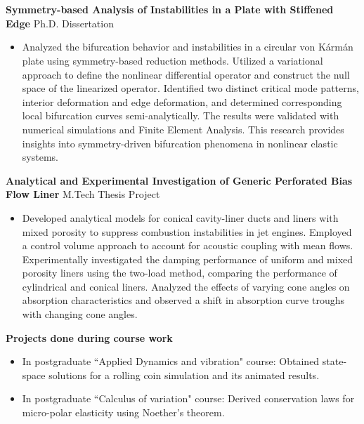 \documentclass[a4paper,10pt]{article}
\newcommand{\mysectionast}[1]{\section*{\colorbox{lightgray}{\makebox[\linewidth][s]{#1\hfill}}}}
\begin{document}
	\mysectionast{Research Topics and Projects}
	\noindent
	\textbf{Symmetry-based Analysis of Instabilities in a Plate with Stiffened Edge} \hfill Ph.D. Dissertation
	\begin{itemize}[left=0pt, label={--}]
		\item Analyzed the bifurcation behavior and instabilities in a circular von Kármán plate using symmetry-based reduction methods. Utilized a variational approach to define the nonlinear differential operator and construct the null space of the linearized operator. Identified two distinct critical mode patterns, interior deformation and edge deformation, and determined corresponding local bifurcation curves semi-analytically. The results were validated with numerical simulations and Finite Element Analysis. This research provides insights into symmetry-driven bifurcation phenomena in nonlinear elastic systems.
	\end{itemize}
	
	
	\noindent
	\textbf{Analytical and Experimental Investigation of Generic Perforated Bias Flow Liner} \hfill M.Tech Thesis Project
	\begin{itemize}[left=0pt, label={--}]
		\item Developed analytical models for conical cavity-liner ducts and liners with mixed porosity to suppress combustion instabilities in jet engines. Employed a control volume approach to account for acoustic coupling with mean flows. Experimentally investigated the damping performance of uniform and mixed porosity liners using the two-load method, comparing the performance of cylindrical and conical liners. Analyzed the effects of varying cone angles on absorption characteristics and observed a shift in absorption curve troughs with changing cone angles.
	\end{itemize}
	
	\vspace{5pt}
	
	\noindent
	\textbf{Projects done during course work}
	\begin{itemize}[left=0pt, label={--}]
		\item In postgraduate ``Applied Dynamics and vibration" course: Obtained state-space solutions for a rolling coin simulation and its animated results.
		\item In postgraduate ``Calculus of variation" course: Derived conservation laws for micro-polar elasticity using Noether's theorem.
	\end{itemize}
	
\end{document}

